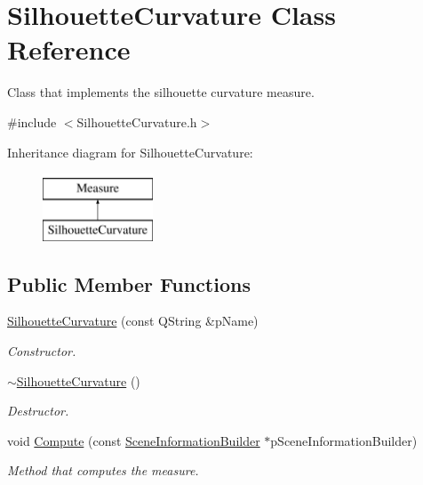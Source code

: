 \hypertarget{class_silhouette_curvature}{\section{Silhouette\+Curvature Class Reference}
\label{class_silhouette_curvature}
}


Class that implements the silhouette curvature measure.  




{\ttfamily \#include $<$Silhouette\+Curvature.\+h$>$}

Inheritance diagram for Silhouette\+Curvature\+:\begin{figure}[H]
\begin{center}
\leavevmode
\includegraphics[height=2.000000cm]{class_silhouette_curvature}
\end{center}
\end{figure}
\subsection*{Public Member Functions}
\begin{DoxyCompactItemize}
\item 
\hyperlink{class_silhouette_curvature_aa6e4ea4d5566f2766e9cd82a428995b5}{Silhouette\+Curvature} (const Q\+String \&p\+Name)
\begin{DoxyCompactList}\small\item\em Constructor. \end{DoxyCompactList}\item 
\hyperlink{class_silhouette_curvature_a9bd99d4651dc505e8e5b9b2e41d7888f}{$\sim$\+Silhouette\+Curvature} ()
\begin{DoxyCompactList}\small\item\em Destructor. \end{DoxyCompactList}\item 
void \hyperlink{class_silhouette_curvature_a712c882cc20c591f4492d48b1d4a3141}{Compute} (const \hyperlink{class_scene_information_builder}{Scene\+Information\+Builder} $\ast$p\+Scene\+Information\+Builder)
\begin{DoxyCompactList}\small\item\em Method that computes the measure. \end{DoxyCompactList}\end{DoxyCompactItemize}
